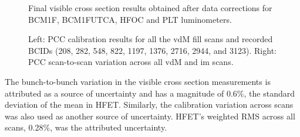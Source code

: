 \begin{figure}[!htb]
	\centering
	\caption[Final visible cross section results for other online luminometers]{Final visible cross section results obtained after data corrections for BCM1F, BCM1FUTCA, HFOC and PLT luminometers.}
	\label{fig:all_Corr_luminometer_xsec}
\end{figure}

\begin{figure}[!htb]
	\centering
	\caption[PCC calibration results]{Left: PCC calibration results for all the vdM fill scans and recorded BCIDs (208, 282, 548, 822, 1197, 1376, 2716, 2944, and 3123). Right: PCC scan-to-scan variation across all vdM and im scans.
	}
	\label{fig:cross_section_results_pcc}
\end{figure}

The bunch-to-bunch variation in the visible cross section measurements is attributed as a source of uncertainty and has a magnitude of 0.6\%, the standard deviation of the mean in HFET. Similarly, the calibration variation across scans was also used as another source of uncertainty. HFET's weighted RMS across all scans, 0.28\%, was the attributed uncertainty.

